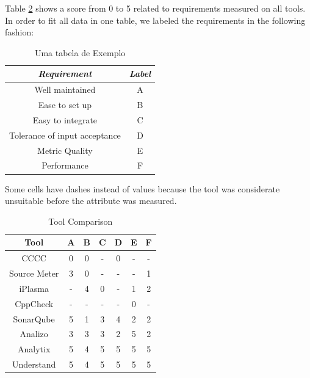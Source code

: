 Table \ref{tab:comp} shows a score from 0 to 5 related to requirements measured on all tools. In order to fit all data in one table, we labeled the requirements in the following fashion:

\begin{table}[ht]
    \caption{Uma tabela de Exemplo}
    \centering
        \begin{tabular}{c|c}
          \hline
          \textit{Requirement}  &   \textit{Label} \\
          \hline
          \hline
          Well maintained & A \\
          Ease to set up & B \\
          Easy to integrate & C \\
          Tolerance of input acceptance & D \\
          Metric Quality & E \\
          Performance  & F \\
          \hline
        \end{tabular}
    \label{tbl:ex1}
\end{table}


Some cells have dashes instead of values because the tool was considerate unsuitable before the attribute was measured.


\begin{table}[H]
\centering
\caption{Tool Comparison}
\label{tab:comp}
\begin{tabular}{|c|c|c|c|c|c|c|}
\hline
\textbf{Tool} & \textbf{A} & \textbf{B} & \textbf{C} & \textbf{D} & \textbf{E} & \textbf{F} \\ \hline
CCCC          & 0 & 0 & - & 0 & - & - \\
Source Meter  & 3 & 0 & - & - & - & 1 \\
iPlasma       & - & 4 & 0 & - & 1 & 2 \\
CppCheck      & - & - & - & - & 0 & - \\
SonarQube     & 5 & 1 & 3 & 4 & 2 & 2 \\
Analizo       & 3 & 3 & 3 & 2 & 5 & 2 \\
Analytix      & 5 & 4 & 5 & 5 & 5 & 5 \\
Understand    & 5 & 4 & 5 & 5 & 5 & 5 \\
\end{tabular}
\end{table}

